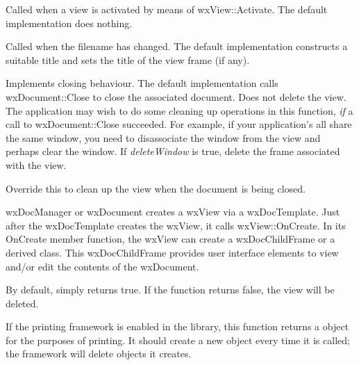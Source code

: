 
Called when a view is activated by means of wxView::Activate. The default implementation does
nothing.



Called when the filename has changed. The default implementation constructs a
suitable title and sets the title of the view frame (if any).



Implements closing behaviour. The default implementation calls wxDocument::Close
to close the associated document. Does not delete the view. The application
may wish to do some cleaning up operations in this function, {\it if} a
call to wxDocument::Close succeeded. For example, if your application's
all share the same window, you need to disassociate the window from the view
and perhaps clear the window. If {\it deleteWindow} is true, delete the
frame associated with the view.

\label{wxviewonclosingdocument}


Override this to clean up the view when the document is being
closed.



wxDocManager or wxDocument creates a wxView via a wxDocTemplate.
Just after the wxDocTemplate creates the wxView, it calls
wxView::OnCreate. In its OnCreate member function, the wxView can create a wxDocChildFrame
or a derived class. This wxDocChildFrame provides user interface
elements to view and/or edit the contents of the wxDocument.

By default, simply returns true. If the function returns false, the
view will be deleted.



If the printing framework is enabled in the library, this function returns a
\rtfsp{} object for the purposes of printing. It should create a new object
every time it is called; the framework will delete objects it creates.

